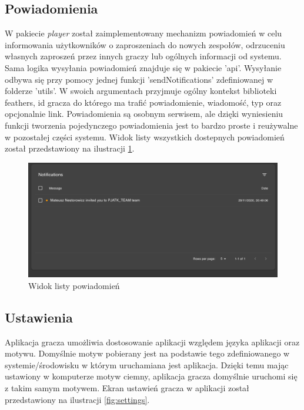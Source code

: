 \subsection{Powiadomienia}

W pakiecie \textit{player} został zaimplementowany mechanizm powiadomień w celu informowania użytkowników o zaproszeniach do nowych zespołów, odrzuceniu własnych zaproszeń przez innych graczy lub ogólnych informacji od systemu. Sama logika wysyłania powiadomień znajduje się w pakiecie 'api'. Wysyłanie odbywa się przy pomocy jednej funkcji 'sendNotifications' zdefiniowanej w folderze 'utils'. W swoich argumentach przyjmuje ogólny kontekst biblioteki feathers, id gracza do którego ma trafić powiadomienie, wiadomość, typ oraz opcjonalnie link. Powiadomienia są osobnym serwisem, ale dzięki wyniesieniu funkcji tworzenia pojedynczego powiadomienia jest to bardzo proste i reużywalne w pozostałej części systemu. Widok listy wszystkich dostepnych powiadomień został przedstawiony na ilustracji \ref{fig:notifications}.

\begin{figure}[h!]
  \centering
    \includegraphics[width=\textwidth]{images/player/notifications.png}
  \caption{Widok listy powiadomień}
  \label{fig:notifications}
\end{figure}

\subsection{Ustawienia}

Aplikacja gracza umożliwia dostosowanie aplikacji względem języka aplikacji oraz motywu. Domyślnie motyw pobierany jest na podstawie tego zdefiniowanego w systemie/środowisku w którym uruchamiana jest aplikacja. Dzięki temu mając ustawiony w komputerze motyw ciemny, aplikacja gracza domyślnie uruchomi się z takim samym motywem. Ekran ustawień gracza w aplikacji został przedstawiony na ilustracji \ref{fig:settings}.

